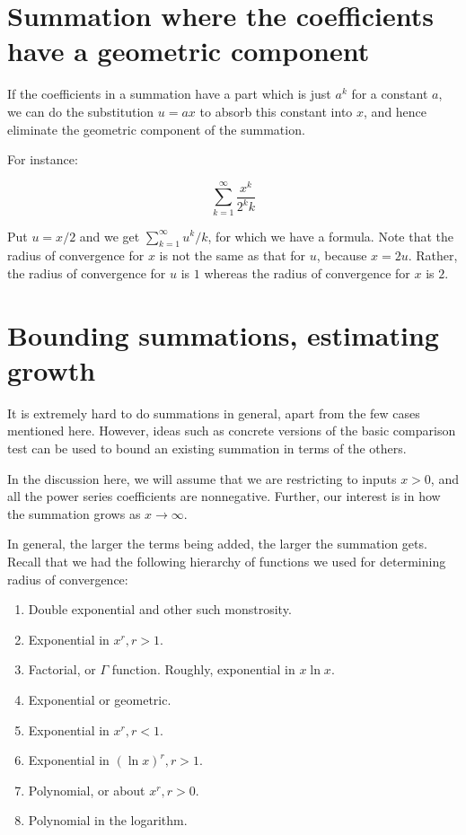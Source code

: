 \documentclass{amsart}
\begin{document}
\section{Summation where the coefficients have a geometric component}

If the coefficients in a summation have a part which is just $a^k$ for
a constant $a$, we can do the substitution $u = ax$ to absorb this
constant into $x$, and hence eliminate the geometric component of the
summation.

For instance:

$$\sum_{k=1}^\infty \frac{x^k}{2^kk}$$

Put $u = x/2$ and we get $\sum_{k=1}^\infty u^k/k$, for which we have
a formula. Note that the radius of convergence for $x$ is not the same
as that for $u$, because $x = 2u$. Rather, the radius of convergence
for $u$ is $1$ whereas the radius of convergence for $x$ is $2$.

\section{Bounding summations, estimating growth}

It is extremely hard to do summations in general, apart from the few
cases mentioned here. However, ideas such as concrete versions of the
basic comparison test can be used to bound an existing summation in
terms of the others.

In the discussion here, we will assume that we are restricting to
inputs $x > 0$, and all the power series coefficients are
nonnegative. Further, our interest is in how the summation grows as $x
\to \infty$.

In general, the larger the terms being added, the larger the summation
gets. Recall that we had the following hierarchy of functions we used
for determining radius of convergence:

\begin{enumerate}
\item Double exponential and other such monstrosity.
\item Exponential in $x^r, r > 1$.
\item Factorial, or $\Gamma$ function. Roughly, exponential in $x \ln
  x$.
\item Exponential or geometric.
\item Exponential in $x^r, r < 1$.
\item Exponential in $(\ln x)^r, r > 1$.
\item Polynomial, or about $x^r, r > 0$.
\item Polynomial in the logarithm.
\end{enumerate}
\end{document}
